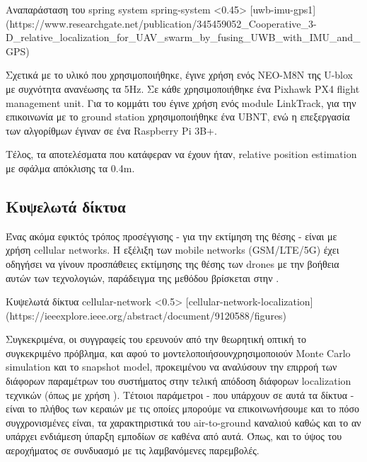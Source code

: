 {Αναπαράσταση του spring system}%
{spring-system}%
<0.45>%
[uwb-imu-gps1]%
(https://www.researchgate.net/publication/345459052_Cooperative_3-D_relative_localization_for_UAV_swarm_by_fusing_UWB_with_IMU_and_GPS)

Σχετικά με το υλικό που χρησιμοποιήθηκε, έγινε χρήση ενός NEO-M8N  της U-blox με συχνότητα ανανέωσης τα 5Hz.  
Σε κάθε  χρησιμοποιήθηκε ένα Pixhawk PX4 flight management unit. Για το κομμάτι του  έγινε χρήση
ενός module LinkTrack, για την επικοινωνία με το ground station χρησιμοποιήθηκε ένα UBNT, ενώ η επεξεργασία των 
αλγορίθμων έγιναν σε ένα Raspberry Pi 3B+. 

Τέλος, τα αποτελέσματα που κατάφεραν να έχουν ήταν,  relative position estimation με σφάλμα απόκλισης τα 0.4m. 

\subsection{Κυψελωτά δίκτυα}
Ένας ακόμα εφικτός τρόπος προσέγγισης - για την εκτίμηση της θέσης - είναι με χρήση
cellular networks. Η εξέλιξη των mobile networks (GSM/LTE/5G) έχει οδηγήσει να γίνουν προσπάθειες εκτίμησης
της θέσης των drones με την βοήθεια αυτών των τεχνολογιών, παράδειγμα της μεθόδου βρίσκεται στην . 

{Κυψελωτά δίκτυα}%
{cellular-network}%
<0.5>%
[cellular-network-localization]%
(https://ieeexplore.ieee.org/abstract/document/9120588/figures)

Συγκεκριμένα, οι συγγραφείς του \cite{cellular-network-localization} ερευνούν από την θεωρητική οπτική το συ\-γκε\-κρι\-μένο πρόβλημα, 
και αφού το μοντελοποιήσουν\udot χρησιμοποιούν Monte Carlo simulation και το snapshot model, προκειμένου να αναλύσουν την επιρροή 
των διάφορων παραμέτρων του συστήματος στην τελική απόδοση διάφορων localization τεχνικών (όπως με χρήση ). Τέτοιοι 
παράμετροι - που υπάρχουν σε αυτά τα δίκτυα - είναι το πλήθος των κεραιών με τις οποίες μπορούμε να επικοινωνήσουμε και το πόσο συγχρονισμένες 
είναι, τα χαρακτηριστικά του air-to-ground καναλιού καθώς και το αν υπάρχει ενδιάμεση ύπαρξη εμποδίων σε καθένα από αυτά. Όπως, και το 
ύψος του αεροχήματος σε συνδυασμό με τις λαμβανόμενες παρεμβολές.

